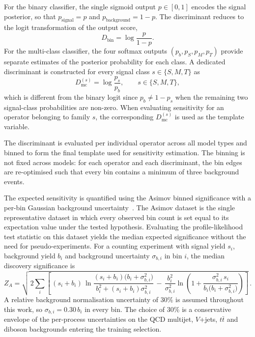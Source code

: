 For the binary classifier, the single sigmoid output $p \in [0,1]$ encodes the signal posterior, so that $p_{\mathrm{signal}} = p$ and $p_{\mathrm{background}} = 1-p$. The discriminant reduces to the logit transformation of the output score,
\begin{equation}
D_{\mathrm{bin}} = \log\frac{p}{1-p}.
\end{equation}
For the multi-class classifier, the four softmax outputs $(p_b,p_S,p_M,p_T)$ provide separate estimates of the posterior probability for each class. A dedicated discriminant is constructed for every signal class $s \in \{S,M,T\}$ as
\begin{equation}
D_{\mathrm{mc}}^{(s)} = \log\frac{p_s}{p_b}, \qquad s \in \{S,M,T\},
\end{equation}
which is different from the binary logit since $p_b \neq 1 - p_s$ when the remaining two signal-class probabilities are non-zero. When evaluating sensitivity for an operator belonging to family $s$, the corresponding $D_{\mathrm{mc}}^{(s)}$ is used as the template variable.

The discriminant is evaluated per individual operator across all model types and binned to form the final template used for sensitivity estimation. The binning is not fixed across models: for each operator and each discriminant, the bin edges are re-optimised such that every bin contains a minimum of three background events. 

The expected sensitivity is quantified using the Asimov binned significance with a per-bin Gaussian background uncertainty~\cite{Cowan:2010js}. The Asimov dataset is the single representative dataset in which every observed bin count is set equal to its expectation value under the tested hypothesis. Evaluating the profile-likelihood test statistic on this dataset yields the median expected significance without the need for pseudo-experiments. For a counting experiment with signal yield $s_i$, background yield $b_i$ and background uncertainty $\sigma_{b,i}$ in bin $i$, the median discovery significance is
\begin{equation}
Z_A = \sqrt{\,2\sum_i\left[\,(s_i+b_i)\,\ln\!\frac{(s_i+b_i)\bigl(b_i+\sigma_{b,i}^{2}\bigr)}{b_i^{2}+(s_i+b_i)\sigma_{b,i}^{2}} \,-\,\frac{b_i^{2}}{\sigma_{b,i}^{2}}\ln\!\left(1+\frac{\sigma_{b,i}^{2}\,s_i}{b_i\bigl(b_i+\sigma_{b,i}^{2}\bigr)}\right)\right]}\,.
\label{eq:zasymptotic}
\end{equation}
A relative background normalisation uncertainty of $30\%$ is assumed throughout this work, so $\sigma_{b,i}=0.30\,b_i$ in every bin. The choice of $30\%$ is a conservative envelope of the per-process uncertainties on the QCD multijet, $V$+jets, $t\bar{t}$ and diboson backgrounds entering the training selection.

